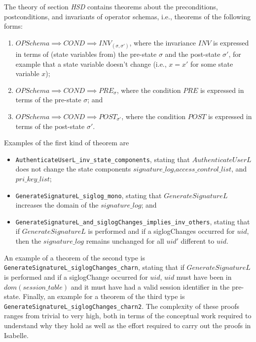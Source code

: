 \documentclass[a4paper,pdftex]{article}
\def\inlinesml{\lstinline[style=sml]}
\begin{document}
The theory of section \emph{HSD} contains theorems about the 
preconditions, postconditions, and invariants of operator schemas, i.e.,
theorems of the following forms:
\begin{enumerate}
\item $OPSchema \implies COND \implies INV_{(\sigma,\sigma')}$,
      where the invariance $INV$ is expressed in terms of
      (state variables from) the pre-state $\sigma$ and the post-state
      $\sigma'$, for example that a state variable doesn't change (i.e.,
      $x = x'$ for some state variable $x$);
\item $OPSchema \implies COND \implies PRE_{\sigma}$,
      where the condition $PRE$ is expressed in terms of
      the pre-state $\sigma$; and
\item $OPSchema \implies COND \implies POST_{\sigma'}$,
      where the condition $POST$ is expressed in terms of
      the post-state $\sigma'$.
\end{enumerate}

Examples of the first kind of theorem are
\begin{itemize}
\item \inlinesml+AuthenticateUserL_inv_state_components+, stating that
$AuthenticateUserL$ does not change the state components
   $signature\_log$,$access\_control\_list$, and $pri\_key\_list$;
\item \inlinesml+GenerateSignatureL_siglog_mono+, stating that 
 $GenerateSignatureL$ increases the domain of the
   $signature\_log$; and
\item \inlinesml+GenerateSignatureL_and_siglogChanges_implies_inv_others+,
stating that if $GenerateSignatureL$ is performed and if a siglogChanges occurred for
$uid$, then the $signature\_log$ remains unchanged for all $uid'$ different
to $uid$.
\end{itemize}
An example of a theorem of the second type is 
\inlinesml+GenerateSignatureL_siglogChanges_charn+, stating
that if $GenerateSignatureL$ is performed and if a siglogChange occurred
for $uid$, $uid$ must have been in $dom (session\_table)$ and it must
have had a valid session identifier in the pre-state.  Finally, an
example for a theorem of the third type is
\inlinesml+GenerateSignatureL_siglogChanges_charn2+.  The complexity of
these proofs ranges from trivial to very high, both in terms of the
conceptual work required to understand why they hold as well as the
effort required to carry out the proofs in Isabelle.
\end{document}
